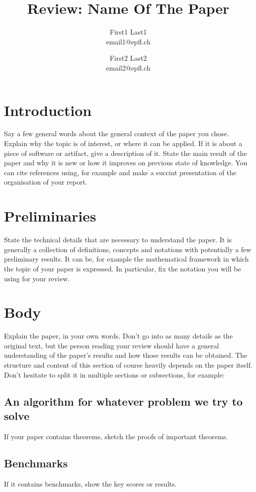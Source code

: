 \documentclass[11pt,a4paper]{article}
\title{Review: Name Of The Paper}
\author{First1 Last1 \\ email1@epfl.ch \and First2 Last2\\email2@epfl.ch}
\begin{document}
\maketitle

\section{Introduction}
Say a few general words about the general context of the paper you chose. Explain why the topic is of interest, or where it can be applied. If it is about a piece of software or artifact, give a description of it. State the main result of the paper and why it is new or how it improves on previous state of knowledge. You can cite references using, for example \cite{BibliographyManagementLaTeX} and make a succint presentation of the organisation of your report.

\section{Preliminaries}
State the technical details that are necessary to understand the paper. It is generally a collection of definitions, concepts and notations with potentially a few preliminary results. It can be, for example the mathematical framework in which the topic of your paper is expressed. In particular, fix the notation you will be using for your review.

\section{Body}
Explain the paper, in your own words. Don't go into as many details as the original text, but the person reading your review should have a general understanding of the paper's results and how those results can be obtained. The structure and content of this section of course heavily depends on the paper itself. Don't hesitate to split it in multiple sections or subsections, for example:
\subsection{An algorithm for whatever problem we try to solve}
If your paper contains theorems, sketch the proofs of important theorems. 

\subsection{Benchmarks}
If it contains benchmarks, show the key scores or results.
\end{document}
